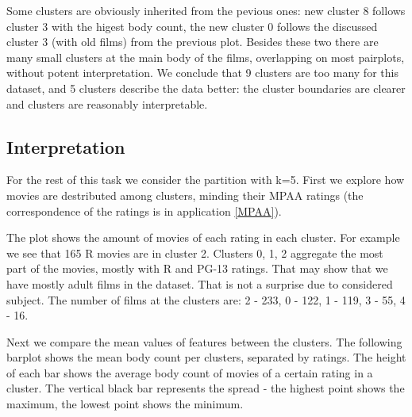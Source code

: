 \documentclass[a4paper,14pt]{article}
\begin{document}
    \begin{center}
\end{center}


Some clusters are obviously inherited from the pevious ones: new cluster 8 follows cluster 3 with the higest body count, the new cluster 0 follows the discussed cluster 3 (with old films) from the previous plot. Besides these two there are many small clusters at the main body of the films, overlapping on most  pairplots, without potent interpretation. We conclude that 9 clusters are too many for this dataset, and 5 clusters describe the data better: the cluster boundaries are clearer and clusters are reasonably interpretable.

\subsection{Interpretation}

For the rest of this task we consider the partition with k=5. First we explore how movies are destributed among clusters, minding their MPAA ratings (the correspondence of the ratings is in application \ref{MPAA}). 

           
\begin{center}
\end{center}

The plot shows the amount of movies of each rating in each cluster. For example we see that 165 R movies are in cluster 2. Clusters 0, 1, 2 aggregate the most part of the movies, mostly with R and PG-13 ratings. That may show that we have mostly adult films in the dataset. That is not a surprise due to considered subject. The number of films at the clusters are: 2 - 233,
0  -  122,
1  -  119,
3  -   55,
4  -   16.

Next we compare the mean values of features between the clusters. The following barplot shows the mean body count per clusters, separated by ratings. The height of each bar shows the average body count of movies of a certain rating in a cluster. The vertical black bar represents the spread - the highest point shows the maximum, the lowest point shows the minimum.


            
\begin{center}
\end{center}
 
\end{document}
